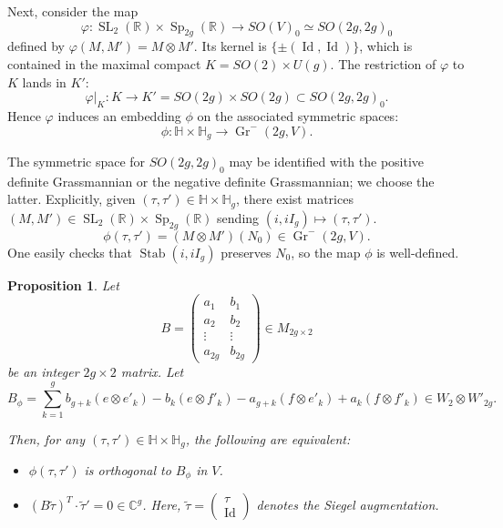 \documentclass[12pt]{amsart}
\def\bC{\mathbb{C}}
\def\bH{\mathbb{H}}
\def\bR{\mathbb{R}}
\def\wt{\widetilde}
\DeclareMathOperator{\Gr}{Gr}
\DeclareMathOperator{\Id}{Id}
\DeclareMathOperator{\SL}{SL}
\DeclareMathOperator{\Sp}{Sp}
\DeclareMathOperator{\Stab}{Stab}
\newcommand{\Hom}{\mathrm{Hom}}
\newtheorem{prop}[thm]{Proposition}
\theoremstyle{definition}
\newcommand{\CL}[1]{{\color{blue}CL: #1}}
\begin{document}
Next, consider the map 
\begin{equation*}
\varphi:\SL_2(\bR) \times \Sp_{2g}(\bR) \to SO(V)_0 \simeq SO(2g,2g)_0
\end{equation*}
defined by $\varphi(M,M')=M\otimes M'$. Its kernel is $\{\pm (\Id,\Id)\}$, which is contained in the maximal compact $K=SO(2)\times U(g)$. The restriction of $\varphi$ to $K$ lands in $K'$:
$$\varphi|_K: K \to K'=SO(2g)\times SO(2g)\subset SO(2g,2g)_0.$$
Hence $\varphi$ induces an embedding $\phi$ on the associated symmetric spaces:
$$\phi: \bH \times \bH_g \to \Gr^-(2g,V).$$

The symmetric space for $SO(2g,2g)_0$ may be identified with the positive definite Grassmannian or the negative definite Grassmannian; we choose the latter. Explicitly, given $(\tau,\tau')\in \bH \times \bH_g$, there exist matrices $(M,M')\in \SL_2(\bR) \times \Sp_{2g}(\bR)$ sending $(i,iI_g)\mapsto (\tau,\tau')$.
$$\phi(\tau,\tau') = (M\otimes M')(N_0)\in \Gr^-(2g,V).$$
One easily checks that $\Stab(i,iI_g)$ preserves $N_0$, so the map $\phi$ is well-defined.\\

\begin{prop}\label{siegelcomp}
Let 
\begin{equation*}
B=\begin{pmatrix}
a_1 & b_1 \\
a_2 & b_2 \\
\vdots & \vdots\\
a_{2g} & b_{2g}
\end{pmatrix}
\in M_{2g\times 2}
\end{equation*}
be an integer $2g\times 2$ matrix. Let
\begin{equation*}
    B_{\phi}=\sum_{k=1}^g b_{g+k}(e\otimes e'_k)-b_k(e\otimes f'_k)-a_{g+k}(f\otimes e'_k)+a_k(f\otimes f'_k)\in W_2\otimes W'_{2g}.
\end{equation*}

Then, for any $(\tau,\tau')\in \bH\times \bH_g$, the following are equivalent:
\begin{itemize}
\item $\phi(\tau,\tau')$ is orthogonal to $B_\phi$ in $V$.
\item $(B\tilde{\tau})^T\cdot \tilde{\tau}'=0\in \bC^g$. Here,  $\tilde{\tau} = \begin{pmatrix} \tau \\ \Id \end{pmatrix}$ denotes the Siegel augmentation.
\end{itemize}
\end{prop}
\end{document}

